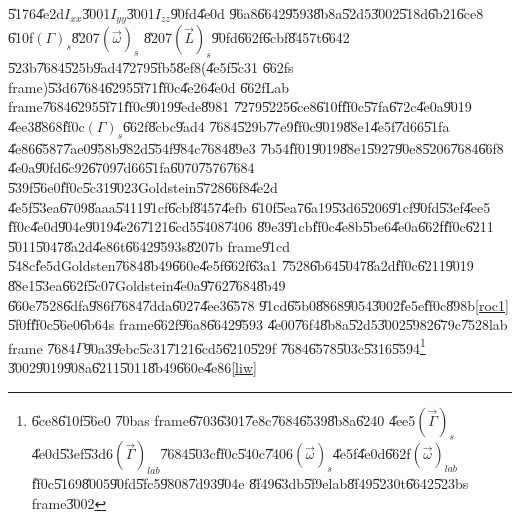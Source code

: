 \documentclass[12pt,a4paper]{article}
\begin{document}
\U{5176}\U{4e2d}$I_{xx}$\U{3001}$I_{yy}$\U{3001}$I_{zz}$\U{90fd}\U{4e0d}%
\U{96a8}\U{6642}\U{9593}\U{8b8a}\U{52d5}\U{3002}\U{518d}\U{6b21}\U{6ce8}%
\U{610f}$\left( \Gamma \right) _{s}$\U{8207}$\left( \vec{\omega}\right) _{s}$%
\U{8207}$\left( \vec{L}\right) _{s}$\U{90fd}\U{662f}\U{6cbf}\U{8457}t\U{6642}%
\U{523b}\U{7684}\U{525b}\U{9ad4}\U{7279}\U{5fb5}\U{8ef8}(\U{4e5f}\U{5c31}%
\U{662f}s frame)\U{53d6}\U{7684}\U{6295}\U{5f71}\U{ff0c}\U{4e26}\U{4e0d}%
\U{662f}Lab frame\U{7684}\U{6295}\U{5f71}\U{ff0c}\U{9019}\U{9ede}\U{8981}%
\U{7279}\U{5225}\U{6ce8}\U{610f}\U{ff0c}\U{57fa}\U{672c}\U{4e0a}\U{9019}%
\U{4ee3}\U{8868}\U{ff0c}$\left( \Gamma \right) _{s}$\U{662f}\U{8cbc}\U{9ad4}%
\U{7684}\U{529b}\U{77e9}\U{ff0c}\U{9019}\U{88e1}\U{4e5f}\U{7d66}\U{51fa}%
\U{4e86}\U{6587}\U{7ae0}\U{958b}\U{982d}\U{554f}\U{984c}\U{7684}\U{89e3}%
\U{7b54}\U{ff01}\U{9019}\U{88e1}\U{5927}\U{90e8}\U{5206}\U{7684}\U{66f8}%
\U{4e0a}\U{90fd}\U{6c92}\U{6709}\U{7d66}\U{51fa}\U{6070}\U{7576}\U{7684}%
\U{539f}\U{56e0}\U{ff0c}\U{5c31}\U{9023}Goldstein\U{5728}\U{66f8}\U{4e2d}%
\U{4e5f}\U{53ea}\U{6709}\U{8aaa}\U{5411}\U{91cf}\U{6cbf}\U{8457}\U{4efb}%
\U{610f}\U{5ea7}\U{6a19}\U{53d6}\U{5206}\U{91cf}\U{90fd}\U{53ef}\U{4ee5}%
\U{ff0c}\U{4e0d}\U{904e}\U{9019}\U{4e26}\U{7121}\U{6cd5}\U{5408}\U{7406}%
\U{89e3}\U{91cb}\U{ff0c}\U{4e8b}\U{5be6}\U{4e0a}\U{662f}\U{ff0c}\U{6211}%
\U{5011}\U{5047}\U{8a2d}\U{4e86}t\U{6642}\U{9593}s\U{8207}b frame\U{91cd}%
\U{548c}\U{fe5d}Goldsten\U{7684}\U{8b49}\U{660e}\U{4e5f}\U{662f}\U{63a1}%
\U{7528}\U{6b64}\U{5047}\U{8a2d}\cite{goldstein}\U{ff0c}\U{6211}\U{9019}%
\U{88e1}\U{53ea}\U{662f}\U{5c07}Goldstein\U{4e0a}\U{9762}\U{7684}\U{8b49}%
\U{660e}\U{7528}\U{6dfa}\U{986f}\U{7684}\U{7dda}\U{6027}\U{4ee3}\U{6578}%
\U{91cd}\U{65b0}\U{8868}\U{9054}\U{3002}\U{fe5e}\U{ff0c}\U{898b}\ref{roc1}%
\U{5f0f}\U{ff0c}\U{56e0}\U{6b64}s frame\U{662f}\U{96a8}\U{6642}\U{9593}%
\U{4e00}\U{76f4}\U{8b8a}\U{52d5}\U{3002}\U{5982}\U{679c}\U{7528}lab frame%
\U{7684}$\Gamma $\U{90a3}\U{9ebc}\U{5c31}\U{7121}\U{6cd5}\U{6210}\U{529f}%
\U{7684}\U{6578}\U{503c}\U{5316}\U{5594}\footnote{\U{6ce8}\U{610f}\U{56e0}%
\U{70ba}s frame\U{6703}\U{6301}\U{7e8c}\U{7684}\U{6539}\U{8b8a}\U{6240}%
\U{4ee5}$\left( \vec{\Gamma}\right) _{s}$\U{4e0d}\U{53ef}\U{53d6}$\left( 
\vec{\Gamma}\right) _{lab}$\U{7684}\U{503c}\U{ff0c}\U{540c}\U{7406}$\left( 
\vec{\omega}\right) _{s}$\U{4e5f}\U{4e0d}\U{662f}$\left( \vec{\omega}\right)
_{lab}$\U{ff0c}\U{5169}\U{8005}\U{90fd}\U{5fc5}\U{9808}\U{7d93}\U{904e}%
\U{8f49}\U{63db}\U{5f9e}lab\U{8f49}\U{5230}t\U{6642}\U{523b}s frame\U{3002}}%
\U{3002}\U{9019}\U{908a}\U{6211}\U{5011}\U{8b49}\U{660e}\U{4e86}\ref{liw}%
\end{document}
